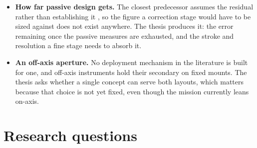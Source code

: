 \begin{itemize}
    \item \textbf{How far passive design gets.} The closest predecessor assumes the residual rather than establishing it \cite{hobijn_design_2023}, so the figure a correction stage would have to be sized against does not exist anywhere. The thesis produces it: the error remaining once the passive measures are exhausted, and the stroke and resolution a fine stage needs to absorb it.

    \item \textbf{An off-axis aperture.} No deployment mechanism in the literature is built for one, and off-axis instruments hold their secondary on fixed mounts. The thesis asks whether a single concept can serve both layouts, which matters because that choice is not yet fixed, even though the mission currently leans on-axis.
\end{itemize}

\section{Research questions}
\label{sec:questions}


